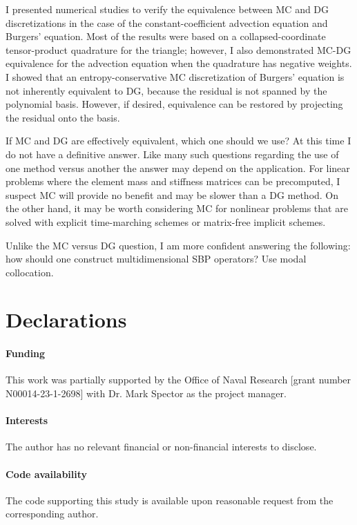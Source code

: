 \documentclass[pdflatex,sn-mathphys-num]{sn-jnl}%
\theoremstyle{thmstyleone}%
\theoremstyle{thmstyletwo}%
\theoremstyle{thmstylethree}%
\begin{document}
I presented numerical studies to verify the equivalence between MC and DG discretizations in the case of the constant-coefficient advection equation and Burgers' equation.  Most of the results were based on a collapsed-coordinate tensor-product quadrature for the triangle; however, I also demonstrated MC-DG equivalence for the advection equation when the quadrature has negative weights.  I showed that an entropy-conservative MC discretization of Burgers' equation is not inherently equivalent to DG, because the residual is not spanned by the polynomial basis.  However, if desired, equivalence can be restored by projecting the residual onto the basis.
 

If MC and DG are effectively equivalent, which one should we use?  At this time I do not have a definitive answer.  Like many such questions regarding the use of one method versus another the answer may depend on the application.  For linear problems where the element mass and stiffness matrices can be precomputed, I suspect MC will provide no benefit and may be slower than a DG method.  On the other hand, it may be worth considering MC for nonlinear problems that are solved with explicit time-marching schemes or matrix-free implicit schemes.

Unlike the MC versus DG question, I am more confident answering the following: how should one construct multidimensional SBP operators?  Use modal collocation.

\section*{Declarations}

\paragraph{Funding}

This work was partially supported by the Office of Naval Research [grant number N00014-23-1-2698] with Dr. Mark Spector as the project manager.

\paragraph{Interests}

The author has no relevant financial or non-financial interests to disclose.

\paragraph{Code availability}

The code supporting this study is available upon reasonable request from the corresponding author.

\end{document}
